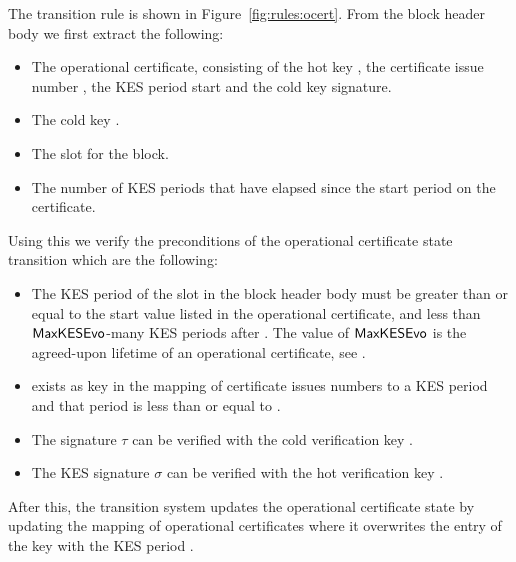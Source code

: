 The transition rule is shown in Figure~\ref{fig:rules:ocert}. From the block
header body  we first extract the following:

\begin{itemize}
  \item The operational certificate, consisting of the hot key ,
    the certificate issue number , the KES period start  and the cold key
  signature.
\item The cold key .
\item The slot  for the block.
\item The number of KES periods that have elapsed since the start period on the certificate.
\end{itemize}

Using this we verify the preconditions of the operational certificate state
transition which are the following:

\begin{itemize}
\item The KES period of the slot in the block header body must be greater than or equal to
  the start value  listed in the operational certificate,
  and less than $\mathsf{MaxKESEvo}$-many KES periods after .
  The value of $\mathsf{MaxKESEvo}$ is the agreed-upon lifetime of an operational certificate,
  see \cite{delegation_design}.
\item {} exists as key in the mapping of certificate issues numbers to a KES
  period  and that period is less than or equal to .
\item The signature $\tau$ can be verified with the cold verification key
  .
\item The KES signature $\sigma$ can be verified with the hot verification key
  .
\end{itemize}

After this, the transition system updates the operational certificate state by
updating the mapping of operational certificates where it overwrites the entry
of the key  with the KES period .

